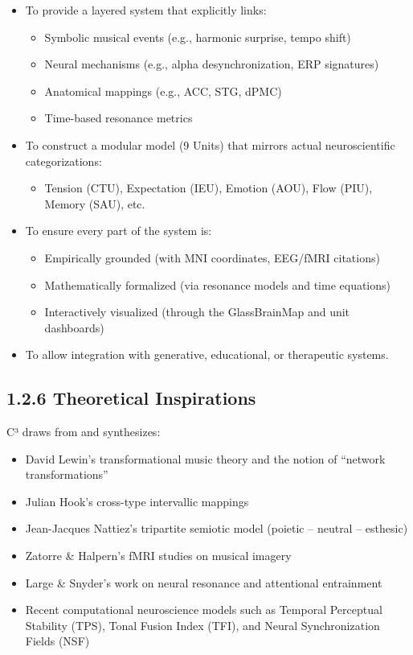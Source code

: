 \begin{itemize}
    \item To provide a layered system that explicitly links:
    \begin{itemize}
        \item Symbolic musical events (e.g., harmonic surprise, tempo shift)
        \item Neural mechanisms (e.g., alpha desynchronization, ERP signatures)
        \item Anatomical mappings (e.g., ACC, STG, dPMC)
        \item Time-based resonance metrics
    \end{itemize}
    
    \item To construct a modular model (9 Units) that mirrors actual neuroscientific categorizations:
    
    \begin{itemize}
        \item Tension (CTU), Expectation (IEU), Emotion (AOU), Flow (PIU), Memory (SAU), etc.
    \end{itemize}
    
    \item To ensure every part of the system is:
    \begin{itemize}
        \item Empirically grounded (with MNI coordinates, EEG/fMRI citations)
        \item Mathematically formalized (via resonance models and time equations)
        \item Interactively visualized (through the GlassBrainMap and unit dashboards)
    \end{itemize}
    
    \item To allow integration with generative, educational, or therapeutic systems.
\end{itemize}

\subsection*{1.2.6 Theoretical Inspirations}

C³ draws from and synthesizes:

\begin{itemize}
    \item David Lewin’s transformational music theory and the notion of “network transformations”
    \item Julian Hook’s cross-type intervallic mappings
    \item Jean-Jacques Nattiez’s tripartite semiotic model (poietic – neutral – esthesic)
    \item Zatorre \& Halpern’s fMRI studies on musical imagery
    \item Large \& Snyder’s work on neural resonance and attentional entrainment
    \item Recent computational neuroscience models such as Temporal Perceptual Stability (TPS), Tonal Fusion Index (TFI), and Neural Synchronization Fields (NSF)
\end{itemize}

